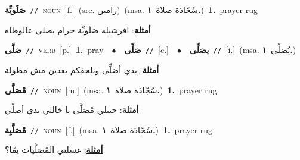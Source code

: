 \documentclass[10pt,a4paper,twoside]{article} %
\begin{document}
\begin{multicols}{2}
{\setlength\topsep{0pt}\textbf{\foreignlanguage{arabic}{صَلَويِّة}}\ {\color{gray}\texttt{//}\color{black}}\ \textsc{noun}\ [f.]\ (src. \color{gray}\foreignlanguage{arabic}{رامين}\color{black})\ \color{gray}(msa. \foreignlanguage{arabic}{سُجّادَة صلاة}~\foreignlanguage{arabic}{\textbf{١.}})\color{black}\ \textbf{1.}~prayer rug\  \begin{flushright}\color{gray}\foreignlanguage{arabic}{\textbf{\underline{\foreignlanguage{arabic}{أمثلة}}}: افرشيله صَلَويِّة حرام بصلي عالوطاة}\end{flushright}\color{black}} \vspace{2mm}

{\setlength\topsep{0pt}\textbf{\foreignlanguage{arabic}{صَلَّى}}\ {\color{gray}\texttt{//}\color{black}}\ \textsc{verb}\ [p.]\ \textbf{1.}~pray\ \ $\bullet$\ \ \setlength\topsep{0pt}\textbf{\foreignlanguage{arabic}{صَلِّى}}\ {\color{gray}\texttt{//}\color{black}}\ [c.]\ \ $\bullet$\ \ \setlength\topsep{0pt}\textbf{\foreignlanguage{arabic}{يصَلِّى}}\ {\color{gray}\texttt{//}\color{black}}\ [i.]\ \color{gray}(msa. \foreignlanguage{arabic}{يُصَلِّى}~\foreignlanguage{arabic}{\textbf{١.}})\color{black}\  \begin{flushright}\color{gray}\foreignlanguage{arabic}{\textbf{\underline{\foreignlanguage{arabic}{أمثلة}}}: بدي أصَلِّى وبلحقكم بعدين مش مطولة}\end{flushright}\color{black}} \vspace{2mm}

{\setlength\topsep{0pt}\textbf{\foreignlanguage{arabic}{مْصَلَّى}}\ {\color{gray}\texttt{//}\color{black}}\ \textsc{noun}\ [m.]\ \color{gray}(msa. \foreignlanguage{arabic}{سُجّادَة صلاة}~\foreignlanguage{arabic}{\textbf{١.}})\color{black}\ \textbf{1.}~prayer rug\  \begin{flushright}\color{gray}\foreignlanguage{arabic}{\textbf{\underline{\foreignlanguage{arabic}{أمثلة}}}: جيبلي مْصَلَّى يا خالتي بدي أصلِّي}\end{flushright}\color{black}} \vspace{2mm}

{\setlength\topsep{0pt}\textbf{\foreignlanguage{arabic}{مْصَلَّيِة}}\ {\color{gray}\texttt{//}\color{black}}\ \textsc{noun}\ [f.]\ \color{gray}(msa. \foreignlanguage{arabic}{سُجّادَة صلاة}~\foreignlanguage{arabic}{\textbf{١.}})\color{black}\ \textbf{1.}~prayer rug\  \begin{flushright}\color{gray}\foreignlanguage{arabic}{\textbf{\underline{\foreignlanguage{arabic}{أمثلة}}}: غسلتي المْصَلَّيات يمّا؟}\end{flushright}\color{black}} \vspace{2mm}


\end{multicols}
\end{document}

